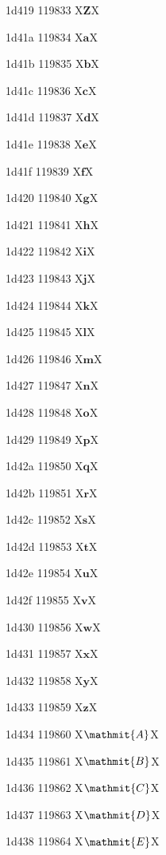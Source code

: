\documentclass[11pt]{article}
\begin{document}
1d419 119833 X{\ensuremath{\mathbf{Z}}}X

1d41a 119834 X{\ensuremath{\mathbf{a}}}X

1d41b 119835 X{\ensuremath{\mathbf{b}}}X

1d41c 119836 X{\ensuremath{\mathbf{c}}}X

1d41d 119837 X{\ensuremath{\mathbf{d}}}X

1d41e 119838 X{\ensuremath{\mathbf{e}}}X

1d41f 119839 X{\ensuremath{\mathbf{f}}}X

1d420 119840 X{\ensuremath{\mathbf{g}}}X

1d421 119841 X{\ensuremath{\mathbf{h}}}X

1d422 119842 X{\ensuremath{\mathbf{i}}}X

1d423 119843 X{\ensuremath{\mathbf{j}}}X

1d424 119844 X{\ensuremath{\mathbf{k}}}X

1d425 119845 X{\ensuremath{\mathbf{l}}}X

1d426 119846 X{\ensuremath{\mathbf{m}}}X

1d427 119847 X{\ensuremath{\mathbf{n}}}X

1d428 119848 X{\ensuremath{\mathbf{o}}}X

1d429 119849 X{\ensuremath{\mathbf{p}}}X

1d42a 119850 X{\ensuremath{\mathbf{q}}}X

1d42b 119851 X{\ensuremath{\mathbf{r}}}X

1d42c 119852 X{\ensuremath{\mathbf{s}}}X

1d42d 119853 X{\ensuremath{\mathbf{t}}}X

1d42e 119854 X{\ensuremath{\mathbf{u}}}X

1d42f 119855 X{\ensuremath{\mathbf{v}}}X

1d430 119856 X{\ensuremath{\mathbf{w}}}X

1d431 119857 X{\ensuremath{\mathbf{x}}}X

1d432 119858 X{\ensuremath{\mathbf{y}}}X

1d433 119859 X{\ensuremath{\mathbf{z}}}X

1d434 119860 X{\ensuremath{\mathmit{A}}}X

1d435 119861 X{\ensuremath{\mathmit{B}}}X

1d436 119862 X{\ensuremath{\mathmit{C}}}X

1d437 119863 X{\ensuremath{\mathmit{D}}}X

1d438 119864 X{\ensuremath{\mathmit{E}}}X
\end{document}
